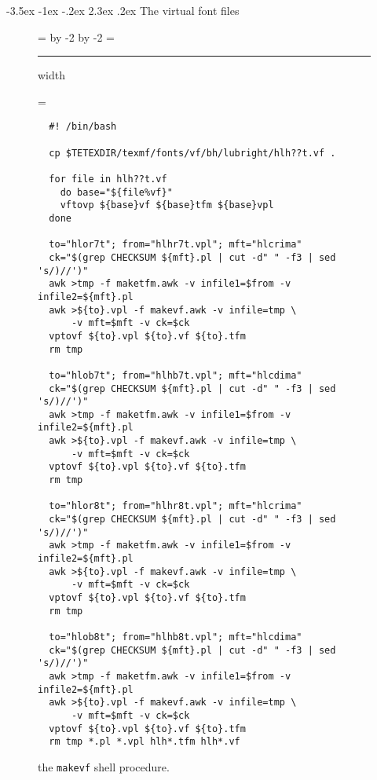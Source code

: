 \documentclass[a4paper]{article}
\makeatletter
\newenvironment{bigbox}
{\begingroup\boxfigwidth=\hsize%
  \advance\boxfigwidth by -2\fboxrule%
  \advance\boxfigwidth by -2\fboxsep%
  \setbox4=\vbox\bgroup\hsize\boxfigwidth%
  \hrule height0pt width\boxfigwidth\par\bigskip%
  \linewidth=\boxfigwidth%
}{\smallskip\egroup\fbox{\box4}\endgroup}
\renewcommand{\section}{\@startsection {section}{1}{\z@}%
  {-3.5ex \@plus -1ex \@minus -.2ex}%
  {2.3ex \@plus.2ex}%
  {\normalfont\Large\sffamily\bfseries}}
\makeatother
\begin{document}
\section{The virtual font files}
\begin{figure}[htbp]
  \begin{bigbox}
\begin{verbatim}
  #! /bin/bash

  cp $TETEXDIR/texmf/fonts/vf/bh/lubright/hlh??t.vf .

  for file in hlh??t.vf
    do base="${file%vf}"
    vftovp ${base}vf ${base}tfm ${base}vpl
  done

  to="hlor7t"; from="hlhr7t.vpl"; mft="hlcrima"
  ck="$(grep CHECKSUM ${mft}.pl | cut -d" " -f3 | sed 's/)//')"
  awk >tmp -f maketfm.awk -v infile1=$from -v infile2=${mft}.pl
  awk >${to}.vpl -f makevf.awk -v infile=tmp \
      -v mft=$mft -v ck=$ck
  vptovf ${to}.vpl ${to}.vf ${to}.tfm
  rm tmp

  to="hlob7t"; from="hlhb7t.vpl"; mft="hlcdima"
  ck="$(grep CHECKSUM ${mft}.pl | cut -d" " -f3 | sed 's/)//')"
  awk >tmp -f maketfm.awk -v infile1=$from -v infile2=${mft}.pl
  awk >${to}.vpl -f makevf.awk -v infile=tmp \
      -v mft=$mft -v ck=$ck
  vptovf ${to}.vpl ${to}.vf ${to}.tfm
  rm tmp

  to="hlor8t"; from="hlhr8t.vpl"; mft="hlcrima"
  ck="$(grep CHECKSUM ${mft}.pl | cut -d" " -f3 | sed 's/)//')"
  awk >tmp -f maketfm.awk -v infile1=$from -v infile2=${mft}.pl
  awk >${to}.vpl -f makevf.awk -v infile=tmp \
      -v mft=$mft -v ck=$ck
  vptovf ${to}.vpl ${to}.vf ${to}.tfm
  rm tmp

  to="hlob8t"; from="hlhb8t.vpl"; mft="hlcdima"
  ck="$(grep CHECKSUM ${mft}.pl | cut -d" " -f3 | sed 's/)//')"
  awk >tmp -f maketfm.awk -v infile1=$from -v infile2=${mft}.pl
  awk >${to}.vpl -f makevf.awk -v infile=tmp \
      -v mft=$mft -v ck=$ck
  vptovf ${to}.vpl ${to}.vf ${to}.tfm
  rm tmp *.pl *.vpl hlh*.tfm hlh*.vf
\end{verbatim}
  \end{bigbox}
  \caption{the \texttt{makevf} shell procedure.}
  \label{fig:vf}
\end{figure}
\end{document}
